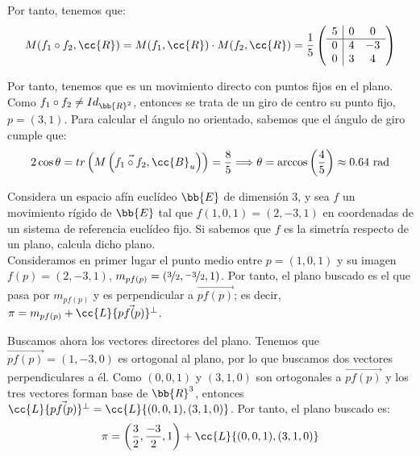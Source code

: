 \begin{ejercicio}
    Por tanto, tenemos que:
    \begin{equation*}
        M(f_1\circ f_2,\cc{R}) = M(f_1,\cc{R})\cdot M(f_2,\cc{R})
        = \frac{1}{5}\left(\begin{array}{c|cc}
            5 & 0 & 0 \\ \hline
            0 & 4 & -3 \\
            0 & 3 & 4
        \end{array}\right)
    \end{equation*}

    Por tanto, tenemos que es un movimiento directo con puntos fijos en el plano. Como $f_1\circ f_2\neq Id_{\bb{R}^2}$, entonces se trata de
    un giro de centro su punto fijo, $p=(3,1)$. Para calcular el ángulo no orientado, sabemos que el ángulo de giro cumple que:
    \begin{equation*}
        2\cos \theta = {tr\left(M\left(\vec{f_1\circ f_2},\cc{B}_u\right)\right)} = \frac{8}{5} \Longrightarrow \theta = \arccos \left(\frac{4}{5}\right) \approx 0.64 \text{ rad}
    \end{equation*}
\end{ejercicio}

\begin{ejercicio}
    Considera un espacio afín euclídeo $\bb{E}$ de dimensión 3, y sea $f$ un movimiento rígido de $\bb{E}$ tal que $f(1, 0, 1) = (2, -3, 1)$ en coordenadas de un sistema de referencia euclídeo fijo. Si sabemos que $f$ es la simetría respecto de un plano, calcula dicho plano.\\

    Consideramos en primer lugar el punto medio entre $p=(1,0,1)$ y su imagen $f(p)=(2,-3,1)$, $m_{pf(p)} = \left(\nicefrac{3}{2},\nicefrac{-3}{2},1\right)$.
    Por tanto, el plano buscado es el que pasa por $m_{pf(p)}$ y es perpendicular a $\vec{pf(p)}$; es decir, $\pi = m_{pf(p)} + \cc{L}\{\vec{pf(p)}\}^\perp$.

    Buscamos ahora los vectores directores del plano. Tenemos que $\vec{pf(p)} = (1,-3,0)$ es ortogonal al plano, por lo que
    buscamos dos vectores perpendiculares a él. Como $(0,0,1)$ y $(3,1, 0)$ son ortogonales a $\vec{pf(p)}$ y los tres vectores forman base de $\bb{R}^3$,
    entonces $\cc{L}\{\vec{pf(p)}\}^\perp = \cc{L}\{(0,0,1), (3,1,0)\}$. Por tanto, el plano buscado es:
    \begin{equation*}
        \pi = \left(\frac{3}{2},\frac{-3}{2},1\right) + \cc{L}\{(0,0,1), (3,1,0)\}
    \end{equation*}
\end{ejercicio}

